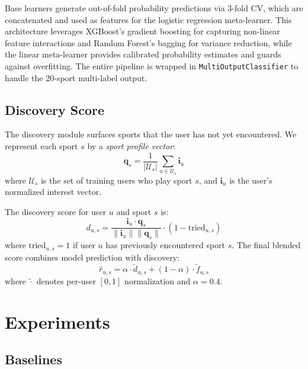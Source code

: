 \documentclass[conference]{IEEEtran}
\begin{document}
Base learners generate out-of-fold probability predictions via 3-fold CV,
which are concatenated and used as features for the logistic regression
meta-learner. This architecture leverages XGBoost's gradient boosting
for capturing non-linear feature interactions and Random Forest's bagging
for variance reduction, while the linear meta-learner provides calibrated
probability estimates and guards against overfitting.
The entire pipeline is wrapped in \texttt{MultiOutputClassifier} to
handle the 20-sport multi-label output.

\subsection{Discovery Score}

The discovery module surfaces sports that the user has not yet encountered.
We represent each sport $s$ by a \textit{sport profile vector}:
\begin{equation}
  \mathbf{q}_s = \frac{1}{|\mathcal{U}_s|} \sum_{u \in \mathcal{U}_s} \mathbf{i}_u
\end{equation}
where $\mathcal{U}_s$ is the set of training users who play sport $s$,
and $\mathbf{i}_u$ is the user's normalized interest vector.

The discovery score for user $u$ and sport $s$ is:
\begin{equation}
  d_{u,s} = \frac{\mathbf{i}_u \cdot \mathbf{q}_s}{\|\mathbf{i}_u\|\|\mathbf{q}_s\|}
             \cdot (1 - \text{tried}_{u,s})
  \label{eq:discovery}
\end{equation}
where $\text{tried}_{u,s} = 1$ if user $u$ has previously encountered sport $s$.
The final blended score combines model prediction with discovery:
\begin{equation}
  \hat{r}_{u,s} = \alpha \cdot \tilde{d}_{u,s} + (1-\alpha) \cdot \tilde{f}_{u,s}
  \label{eq:blend}
\end{equation}
where $\tilde{\cdot}$ denotes per-user $[0,1]$ normalization and $\alpha = 0.4$.

\section{Experiments}
\label{sec:experiments}

\subsection{Baselines}
\end{document}
